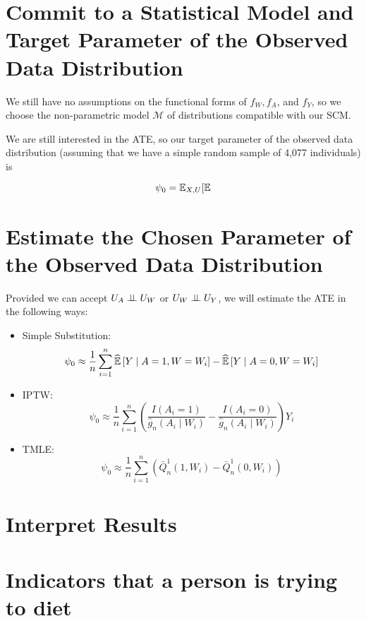 \documentclass{article}
\begin{document}
\section{Commit to a Statistical Model and Target Parameter of the Observed Data Distribution}

We still have no assumptions on the functional forms of $f_W, f_A$, and $f_Y$, so we choose the non-parametric model $\mathcal{M}$ of distributions compatible with our SCM.  

We are still interested in the ATE, so our target parameter of the observed data distribution (assuming that we have a simple random sample of 4,077 individuals) is

$$\psi_0 = \mathbb{E}_{X,U}[ \mathbb{E}$$

\section{Estimate the Chosen Parameter of the Observed Data Distribution}

Provided we can accept $U_A \perp\hspace{-5pt}\perp U_W$ or $U_W \perp\hspace{-5pt}\perp U_Y$, we will estimate the ATE in the following ways: 

\begin{itemize}
  \item Simple Substitution:
    \[
      \psi_0 \approx \frac{1}{n}\sum_{i=1}^{n}\widehat{\mathbb{E}}\left[Y \mid A=1, W=W_i \right] - \widehat{\mathbb{E}}\left[Y \mid A=0, W=W_i\right]
    \]
  \item IPTW:
  \[
    \psi_{0} \approx \frac{1}{n}\sum_{i=1}^{n} \left(\frac{I(A_i=1)}{\hat{g}_n(A_i \mid W_i)} - \frac{I(A_i=0)}{\hat{g}_n(A_i \mid W_i)} \right)Y_i
  \]
  \item TMLE:
  \[
    \psi_{0} \approx \frac{1}{n}\sum_{i=1}^{n}\left( \bar{Q}_{n}^{1}(1,W_i) - \bar{Q}_{n}^{1}(0,W_i)\right)
  \]
\end{itemize}


\section{Interpret Results}





\section{Indicators that a person is trying to diet}
\end{document}
